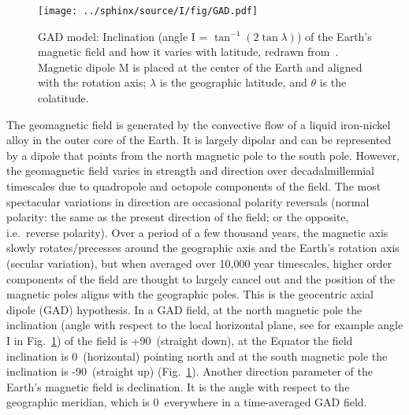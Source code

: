 \begin{figure}[!ht]
  \centering
    \texttt{[image: ../sphinx/source/I/fig/GAD.pdf]}
  \captionsetup{width=.95\textwidth}
  \caption[Geocentric axial dipole model]{GAD model: Inclination (angle I
  = $\tan^{-1}(2\tan\lambda)$) of the Earth's magnetic field and how it varies
  with latitude, redrawn from~\citet{B92,T08,T20}. Magnetic dipole M is placed
  at the center of the Earth and aligned with the rotation axis; $\lambda$ is
  the geographic latitude, and $\theta$ is the
  colatitude.}\label{Fig:chap_intro_gad}
\end{figure}

The geomagnetic field is generated by the convective flow of a liquid
iron-nickel alloy in the outer core of the Earth. It is largely dipolar and can
be represented by a dipole that points from the north magnetic pole to the south
pole. However, the geomagnetic field varies in strength and direction over
decadal\textendash{}millennial timescales due to quadropole and octopole
components of the field. The most spectacular variations in direction are
occasional polarity reversals (normal polarity: the same as the present
direction of the field; or the opposite, i.e.\ reverse polarity). Over a period
of a few thousand years, the magnetic axis slowly rotates/precesses around the
geographic axis and the Earth's rotation axis (secular variation), but when
averaged over 10,000 year timescales, higher order components of the field are
thought to largely cancel out and the position of the magnetic poles aligns with
the geographic poles. This is the geocentric axial dipole (GAD) hypothesis. In a
GAD field, at the north magnetic pole the inclination (angle with respect to the
local horizontal plane, see for example angle I in
Fig.~\ref{Fig:chap_intro_gad}) of the field is +90\degree\ (straight down), at
the Equator the field inclination is 0\degree\ (horizontal) pointing north and
at the south magnetic pole the inclination is -90\degree\ (straight up)
(Fig.~\ref{Fig:chap_intro_gad}). Another direction parameter of the Earth's
magnetic field is declination. It is the angle with respect to the geographic
meridian, which is 0\degree\ everywhere in a time-averaged GAD field.

